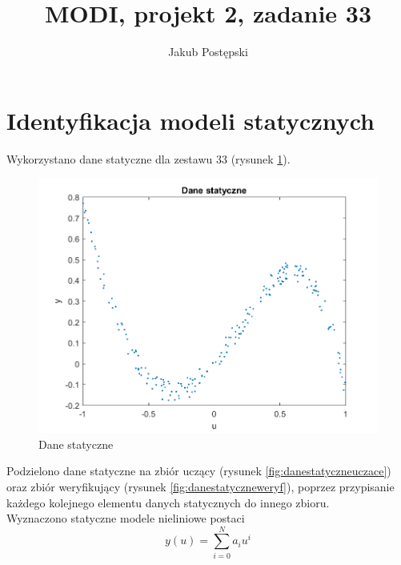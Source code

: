 \documentclass{article}
\author{Jakub Postępski}
\title{MODI, projekt 2, zadanie 33}
\begin{document}
\maketitle
\section{Identyfikacja modeli statycznych}
Wykorzystano dane statyczne dla zestawu 33 (rysunek \ref{fig:danestatyczne}).
\begin{figure}
\centering
\includegraphics[width=0.95\linewidth]{../dane_statyczne/dane_statyczne}
\caption{Dane statyczne}
\label{fig:danestatyczne}
\end{figure}

Podzielono dane statyczne na zbiór uczący (rysunek \ref{fig:danestatyczneuczace}) oraz zbiór weryfikujący (rysunek \ref{fig:danestatyczneweryf}), poprzez przypisanie każdego kolejnego elementu danych statycznych do innego zbioru.\\
Wyznaczono statyczne modele nieliniowe postaci
\[y(u) = \sum_{i = 0}^{N}a_i u^i\]
\end{document}
